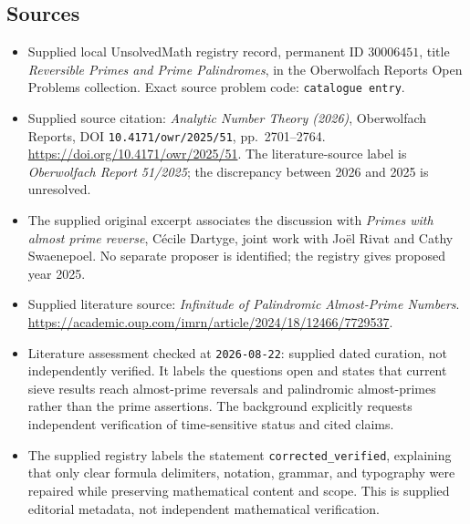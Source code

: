 \documentclass[11pt]{article}
\begin{document}
\subsection{Sources}
\begin{itemize}
\item Supplied local UnsolvedMath registry record, permanent ID \(30006451\), title \emph{Reversible Primes and Prime Palindromes}, in the Oberwolfach Reports Open Problems collection. Exact source problem code: \texttt{catalogue entry}.
\item Supplied source citation: \emph{Analytic Number Theory (2026)}, Oberwolfach Reports, DOI \texttt{10.4171/owr/2025/51}, pp.\ 2701--2764. \url{https://doi.org/10.4171/owr/2025/51}. The literature-source label is \emph{Oberwolfach Report 51/2025}; the discrepancy between 2026 and 2025 is unresolved.
\item The supplied original excerpt associates the discussion with \emph{Primes with almost prime reverse}, C\'ecile Dartyge, joint work with Jo\"el Rivat and Cathy Swaenepoel. No separate proposer is identified; the registry gives proposed year 2025.
\item Supplied literature source: \emph{Infinitude of Palindromic Almost-Prime Numbers}. \url{https://academic.oup.com/imrn/article/2024/18/12466/7729537}.
\item Literature assessment checked at \texttt{2026-08-22}: supplied dated curation, not independently verified. It labels the questions open and states that current sieve results reach almost-prime reversals and palindromic almost-primes rather than the prime assertions. The background explicitly requests independent verification of time-sensitive status and cited claims.
\item The supplied registry labels the statement \texttt{corrected\_verified}, explaining that only clear formula delimiters, notation, grammar, and typography were repaired while preserving mathematical content and scope. This is supplied editorial metadata, not independent mathematical verification.
\end{itemize}
\end{document}
